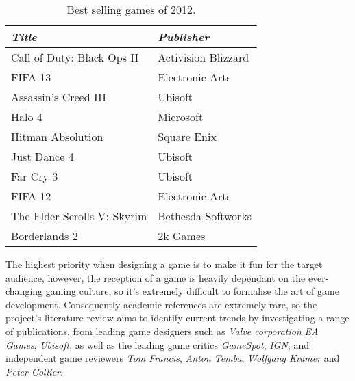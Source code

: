 \begin{table*}[!ht]
	\begin{tabular}{p{15em} p{13em}}
		\toprule
		\emph{Title} & \emph{Publisher}\\
		\midrule
	Call of Duty: Black Ops II & Activision Blizzard
	\\
	FIFA 13 & Electronic Arts
	\\
	Assassin's Creed III & Ubisoft
	\\
    Halo 4 & Microsoft	
    \\
	Hitman Absolution & Square Enix
	\\
	Just Dance 4 & Ubisoft
	\\
	Far Cry 3 & Ubisoft
	\\
	FIFA 12 & Electronic Arts
	\\
	The Elder Scrolls V: Skyrim & Bethesda Softworks
	\\
	Borderlands 2 & 2k Games
	\\
	\bottomrule
	\end{tabular}
	\caption[Best selling games of 2012]{Best selling games of 2012.}
	\label{tab:bestSellingGames2012}
\end{table*}

The highest priority when designing a game is to make it fun for the target audience, however, the reception of a game is heavily dependant on the ever-changing  gaming culture, so it's extremely difficult to formalise the art of game development. Consequently academic references are extremely rare, so the project's literature review aims to identify current trends by investigating a range of publications, from leading game designers such as \emph{Valve corporation} \emph{EA Games}, \emph{Ubisoft}, as well as the leading game critics \emph{GameSpot}, \emph{IGN}, and independent game reviewers \emph{Tom Francis}, \emph{Anton Temba}, \emph{Wolfgang Kramer} and \emph{Peter Collier}.\cite[-2em]{makeuseof, ebizmba}

\ 


